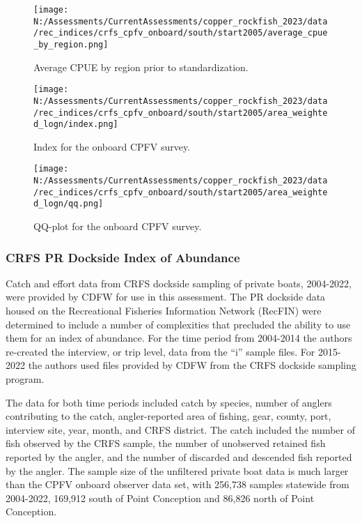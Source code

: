 \documentclass[11pt,
  english,
  letterpaper,
]{article}
\begin{document}
\newpage

\begin{figure}
\centering
\texttt{[image: N:/Assessments/CurrentAssessments/copper\_rockfish\_2023/data/rec\_indices/crfs\_cpfv\_onboard/south/start2005/average\_cpue\_by\_region.png]}
\caption{Average CPUE by region prior to standardization.\label{fig:onboard-regioncpue}}
\end{figure}

\newpage

\begin{figure}
\centering
\texttt{[image: N:/Assessments/CurrentAssessments/copper\_rockfish\_2023/data/rec\_indices/crfs\_cpfv\_onboard/south/start2005/area\_weighted\_logn/index.png]}
\caption{Index for the onboard CPFV survey.\label{fig:onboard-index}}
\end{figure}

\newpage

\begin{figure}
\centering
\texttt{[image: N:/Assessments/CurrentAssessments/copper\_rockfish\_2023/data/rec\_indices/crfs\_cpfv\_onboard/south/start2005/area\_weighted\_logn/qq.png]}
\caption{QQ-plot for the onboard CPFV survey.\label{fig:onboard-qq}}
\end{figure}

\newpage

\hypertarget{crfs-pr-index}{%
\subsubsection{CRFS PR Dockside Index of Abundance}\label{crfs-pr-index}}

Catch and effort data from CRFS dockside sampling of private boats, 2004-2022, were provided by CDFW for use in this assessment. The PR dockside data housed on the Recreational Fisheries Information Network (RecFIN) were determined to include a number of complexities that precluded the ability to use them for an index of abundance. For the time period from 2004-2014 the authors re-created the interview, or trip level, data from the ``i'' sample files. For 2015-2022 the authors used files provided by CDFW from the CRFS dockside sampling program.

The data for both time periods included catch by species, number of anglers contributing to the catch, angler-reported area of fishing, gear, county, port, interview site, year, month, and CRFS district. The catch included the number of fish observed by the CRFS sample, the number of unobserved retained fish reported by the angler, and the number of discarded and descended fish reported by the angler. The sample size of the unfiltered private boat data is much larger than the CPFV onboard observer data set, with 256,738 samples statewide from 2004-2022, 169,912 south of Point Conception and 86,826 north of Point Conception.
\end{document}
